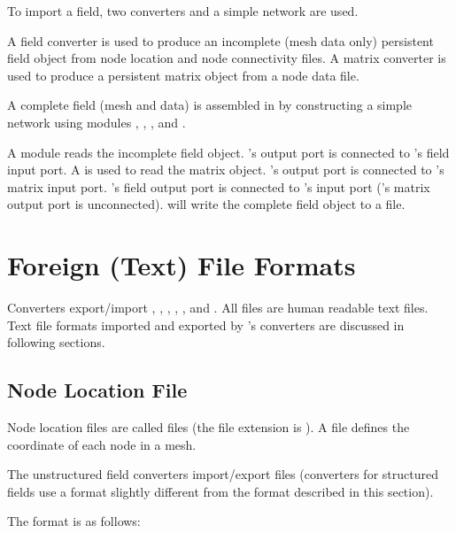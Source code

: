 To import a field, two converters and a simple \sr{} network are used.

A field converter is used to produce an incomplete (mesh data only)
persistent field object from node location and node connectivity
files.  A matrix converter is used to produce a persistent matrix
object from a node data file.

A complete field (mesh and data) is assembled in \sr{} by
constructing a simple network using modules ,
,  , and
.

A  module reads the incomplete field object.
's output port is connected to
's field input port.  A
 is used to read the matrix object.
's output port is connected to
's matrix input port.
's field output port is connected to
's input port ('s
matrix output port is unconnected).   will write
the complete field object to a file.

\section{Foreign (Text) File Formats}

Converters export/import , , , , ,  and .  All files are human readable text files.  Text file formats
imported and exported by \sr{}'s converters are discussed in following
sections.

\subsection{Node Location File}
\label{sec:node_loc_fmt}

Node location files are called  files (the file extension is
).  A  file defines the coordinate of
each node in a mesh.

The unstructured field converters import/export  files
(converters for structured fields use a  format slightly
different from the format described in this section).

The format is as follows:

